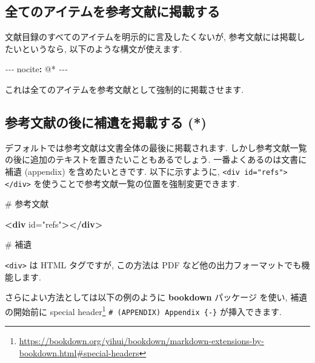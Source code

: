 \documentclass[
  11pt,
  lualatex,
  ja=standard]{bxjsreport}
\newenvironment{Shaded}{\begin{snugshade}}{\end{snugshade}}
\newcommand{\AttributeTok}[1]{\textcolor[rgb]{0.77,0.63,0.00}{#1}}
\newcommand{\FunctionTok}[1]{\textcolor[rgb]{0.00,0.00,0.00}{#1}}
\newcommand{\KeywordTok}[1]{\textcolor[rgb]{0.13,0.29,0.53}{\textbf{#1}}}
\newcommand{\OtherTok}[1]{\textcolor[rgb]{0.56,0.35,0.01}{#1}}
\newcommand{\PreprocessorTok}[1]{\textcolor[rgb]{0.56,0.35,0.01}{\textit{#1}}}
\newcommand{\StringTok}[1]{\textcolor[rgb]{0.31,0.60,0.02}{#1}}
\renewcommand{\href}[2]{#2\footnote{\url{#1}}}
\begin{document}
\hypertarget{add-all-items-to-the-bibliography}{%
\subsection{全てのアイテムを参考文献に掲載する}\label{add-all-items-to-the-bibliography}}

文献目録のすべてのアイテムを明示的に言及したくないが, 参考文献には掲載したいというなら, 以下のような構文が使えます.

\begin{Shaded}
\begin{Highlighting}[]
\PreprocessorTok{{-}{-}{-}}
\FunctionTok{nocite}\KeywordTok{:}\AttributeTok{ }\StringTok{\textquotesingle{}@*\textquotesingle{}}
\PreprocessorTok{{-}{-}{-}}
\end{Highlighting}
\end{Shaded}

これは全てのアイテムを参考文献として強制的に掲載させます.

\hypertarget{include-appendix-after-bibliography}{%
\subsection{参考文献の後に補遺を掲載する (*)}\label{include-appendix-after-bibliography}}

デフォルトでは参考文献は文書全体の最後に掲載されます. しかし参考文献一覧の後に追加のテキストを置きたいこともあるでしょう. 一番よくあるのは文書に補遺 (appendix) を含めたいときです. 以下に示すように, \texttt{\textless{}div\ id="refs"\textgreater{}\textless{}/div\textgreater{}} を使うことで参考文献一覧の位置を強制変更できます.

\begin{Shaded}
\begin{Highlighting}[]
\FunctionTok{\# 参考文献}

\KeywordTok{\textless{}div}\OtherTok{ id=}\StringTok{"refs"}\KeywordTok{\textgreater{}\textless{}/div\textgreater{}}

\FunctionTok{\# 補遺}
\end{Highlighting}
\end{Shaded}

\texttt{\textless{}div\textgreater{}} は HTML タグですが, この方法は PDF など他の出力フォーマットでも機能します.

さらによい方法としては以下の例のように \textbf{bookdown} パッケージ \autocite{R-bookdown} を使い, 補遺の開始前に \href{https://bookdown.org/yihui/bookdown/markdown-extensions-by-bookdown.html\#special-headers}{special header} \texttt{\# (APPENDIX) Appendix \{-\}} が挿入できます.
\end{document}
